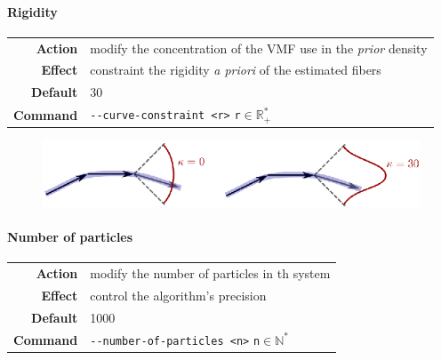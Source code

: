         \paragraph*{Rigidity}
            \begin{center}
                \begin{tabular}{rl}
                    \textbf{Action}  & modify the concentration of the VMF use in the \emph{prior} density\\
                    \textbf{Effect}  & constraint the rigidity \emph{a priori} of the estimated fibers\\
                    \textbf{Default} & 30\\
                    \textbf{Command} & \texttt{-\hspace{0.1mm}-curve-constraint <r>} \hfill \texttt{r}$\in\mathbb{R}_+^*$
                \end{tabular}
            \end{center}

            \begin{figure}
                \centering
                \includegraphics[height=0.1\textheight]{concentration}
                \caption{}
            \end{figure}

        \paragraph*{Number of particles}
            \begin{center}
                \begin{tabular}{rl}
                    \textbf{Action}  & modify the number of particles in th system\\
                    \textbf{Effect}  & control the algorithm's precision\\
                    \textbf{Default} & 1000\\
                    \textbf{Command} & \texttt{-\hspace{0.1mm}-number-of-particles <n>} \hfill \texttt{n}$\in\mathbb{N}^*$
                \end{tabular}
            \end{center}


